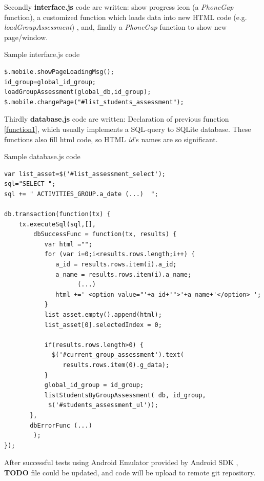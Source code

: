 	   
	   
	   
	   
    Secondly { \bf interface.js} code are written: show progress icon (a \emph{PhoneGap} function), a customized function which loads data into new HTML code (e.g. \emph{loadGroupAssessment}) , 
    and, finally a \emph{PhoneGap} function to  show new page/window.
\begin{bclogo}[couleur=blue!30,arrondi=0.1,ombre=true ] 
{Sample interface.js code}        
        \begin{verbatim}
$.mobile.showPageLoadingMsg();
id_group=global_id_group; 
loadGroupAssessment(global_db,id_group);
$.mobile.changePage("#list_students_assessment");
    \end{verbatim}  
\end{bclogo}

    Thirdly {\bf database.js} code are written: Declaration of previous function \ref{function1}, which  usually implements a SQL-query to SQLite database. These functions also fill html code, so HTML \emph{id}'s names are so significant.
    
\begin{bclogo}[couleur=blue!30,arrondi=0.1,ombre=true ] 
{Sample database.js code}    
\begin{verbatim}
var list_asset=$('#list_assessment_select'); 
sql="SELECT ";
sql += " ACTIVITIES_GROUP.a_date (...)  ";

db.transaction(function(tx) {
    tx.executeSql(sql,[],
        dbSuccessFunc = function(tx, results) {
           var html ="";
           for (var i=0;i<results.rows.length;i++) {
              a_id = results.rows.item(i).a_id;
              a_name = results.rows.item(i).a_name;
                    (...)
              html +=' <option value="'+a_id+'">'+a_name+'</option> ';
           }
           list_asset.empty().append(html);
           list_asset[0].selectedIndex = 0; 

           if(results.rows.length>0) {
             $('#current_group_assessment').text(
                results.rows.item(0).g_data); 
           }
           global_id_group = id_group;
           listStudentsByGroupAssessment( db, id_group, 
            $('#students_assessment_ul'));
       },
       dbErrorFunc (...)
        ); 
});
\end{verbatim}    
\end{bclogo}    
    
    After successful tests using Android Emulator provided by Android SDK \cite{AndroidDevelopmentKit}, {\bf TODO} file could be updated, and code will be upload to remote git \cite{EduXes} repository.
  
